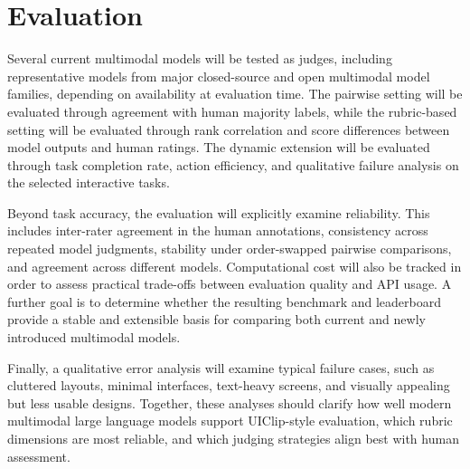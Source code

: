 \documentclass[pdflatex,sn-mathphys-num]{sn-jnl}
\begin{document}
\section{Evaluation}\label{sec:evaluation}

Several current multimodal models will be tested as judges, including representative
models from major closed-source and open multimodal model families, depending on
availability at evaluation time. The pairwise setting will be evaluated through
agreement with human majority labels, while the rubric-based setting will be evaluated
through rank correlation and score differences between model outputs and human ratings.
The dynamic extension will be evaluated through task completion rate, action
efficiency, and qualitative failure analysis on the selected interactive tasks.

Beyond task accuracy, the evaluation will explicitly examine reliability. This includes
inter-rater agreement in the human annotations, consistency across repeated model
judgments, stability under order-swapped pairwise comparisons, and agreement across
different models. Computational cost will also be tracked in order to assess practical
trade-offs between evaluation quality and API usage. A further goal is to determine
whether the resulting benchmark and leaderboard provide a stable and extensible basis
for comparing both current and newly introduced multimodal models.

Finally, a qualitative error analysis will examine typical failure cases, such as
cluttered layouts, minimal interfaces, text-heavy screens, and visually appealing but
less usable designs. Together, these analyses should clarify how well modern
multimodal large language models support UIClip-style evaluation, which rubric
dimensions are most reliable, and which judging strategies align best with human
assessment.

\backmatter

{\footnotesize\setlength{\bibsep}{0pt}}
\end{document}
